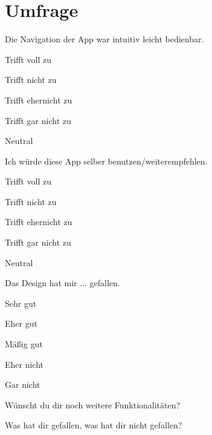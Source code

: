 \documentclass{article}
\newenvironment{Ckcol}[1]{\begin{multicols}{#1}%
        \begin{todolist}}%
              {\end{todolist}%
                           \end{multicols}}
\begin{document}
\center \section*{Umfrage} 
Die Navigation der App war intuitiv leicht bedienbar.
   \begin{Ckcol}{3}

    \item  Trifft voll zu
    \item  Trifft nicht zu
    \item  Trifft ehernicht zu
    \item  Trifft gar nicht zu
    \item  Neutral

   \end{Ckcol}     

 Ich würde diese App selber benutzen/weiterempfehlen.
      \begin{Ckcol}{3}

    \item  Trifft voll zu
    \item  Trifft nicht zu
    \item  Trifft ehernicht zu
    \item  Trifft gar nicht zu
    \item  Neutral
    

   \end{Ckcol}
 
   
   
  Das Design hat mir ... gefallen.
      \begin{Ckcol}{3}

    \item  Sehr gut
    \item  Eher gut
    \item  Mäßig gut
    \item  Eher nicht
    \item  Gar nicht
    

   \end{Ckcol}
   
   
Wünscht du dir noch weitere Funktionalitäten?
\begin{center}
 \setlength{\fboxsep}{1pt} 
 \fbox{\parbox[t][4cm][t]{10cm}{~}}
\end{center}

Was hat dir gefallen, was hat dir nicht gefallen?
\begin{center}
 \setlength{\fboxsep}{1pt} 
 \fbox{\parbox[t][4cm][t]{10cm}{~}}
\end{center}
\end{document}
